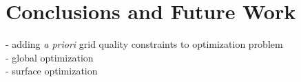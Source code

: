\section{Conclusions and Future Work}
- adding {\it{a priori}} grid quality constraints to optimization problem \\
- global optimization \\
- surface optimization
